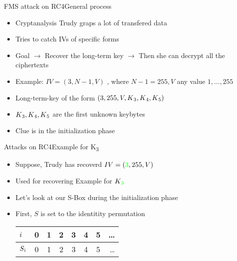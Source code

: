 \documentclass[
	aspectratio=169,	%
	onlytextwidth,		%
	t,					%
	]{beamer}
\begin{document}
\begin{frame}[fragile]{FMS attack on RC4}{General process}
	\begin{itemize}
		\item Cryptanalysis Trudy graps a lot of transfered data
		\item Tries to catch IVs of specific forms 
		\item Goal $\rightarrow$ Recover the long-term key $\rightarrow$ Then she can decrypt all the ciphertexts
		\item Example: $ IV = (3, N-1, V)$ , where $N-1 = 255, V$ any value ${1,\dots,255}$
		\item Long-term-key of the form $(3, 255, V, K\textsubscript{3}, K\textsubscript{4},K\textsubscript{5})$
		\item $K\textsubscript{3}, K\textsubscript{4},K\textsubscript{5}$ are the first unknown keybytes
		\item Clue is in the initialization phase
	\end{itemize}
\end{frame}

\begin{frame}[fragile]{Attacks on RC4}{Example for K\textsubscript{3}}
	\begin{itemize}
		\item Suppose, Trudy has recoverd $IV = (\textcolor{green}{3}, 255, V)$ 
		\item Used for recovering Example for $K\textsubscript{\textcolor{green}{3}}$
		\item Let's look at our S-Box during the initialization phase
		\item First, $S$ is set to the identitity permutation
		\medskip
		\begin{table}[h!]
			\begin{center}
			  \begin{tabular}{l|c|c|c|c|c|c|r}
				$i$ & 0 & 1 & 2 & 3 & 4 & 5 & \dots\\
				\hline
				$S\textsubscript{i}$ & 0 & 1 & 2 & 3 & 4 & 5 & \dots\\
			  \end{tabular}
			\end{center}
		  \end{table}

	\end{itemize}
\end{frame}
\end{document}
